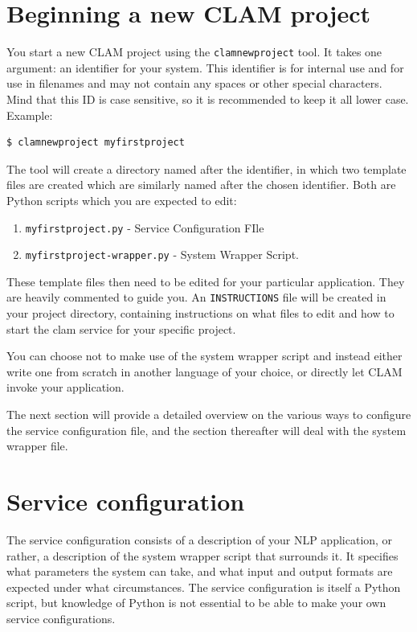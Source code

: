\documentclass[a4paper,12pt]{report}
\begin{document}
\section{Beginning a new CLAM project}

You start a new CLAM project using the \texttt{clamnewproject} tool. It takes
one argument: an identifier for your system. This identifier is for internal
use and for use in filenames and may not contain any spaces or other special
characters. Mind that this ID is case sensitive, so it is recommended to keep
it all lower case. Example:

\begin{verbatim}
$ clamnewproject myfirstproject 
\end{verbatim}

The tool will create a directory named after the identifier, in which two
template files are created which are similarly named after the chosen
identifier. Both are Python scripts which you are expected to edit:

\begin{enumerate}
\item \texttt{myfirstproject.py} - Service Configuration FIle
\item \texttt{myfirstproject-wrapper.py} - System Wrapper Script.
\end{enumerate}

These template files then need to be edited for your particular application.
They are heavily commented to guide you. An \texttt{INSTRUCTIONS} file will be
created in your project directory, containing instructions on what files to
edit and  how to start the clam service for your specific project.

You can choose not to make use of the system wrapper script and instead either
write one from scratch in another language of your choice, or directly let CLAM
invoke your application.

The next section will provide a detailed overview on the various ways to
configure the service configuration file, and the section thereafter will deal
with the system wrapper file.

\section{Service configuration}
\label{sec:serviceconfig}

The service configuration consists of a description of your NLP application, or
rather, a description of the system wrapper script that surrounds it. It
specifies what parameters the system can take, and what input and output
formats are expected under what circumstances. The service configuration is
itself a Python script, but knowledge of Python is not essential to be able to
make your own service configurations. 
\end{document}
